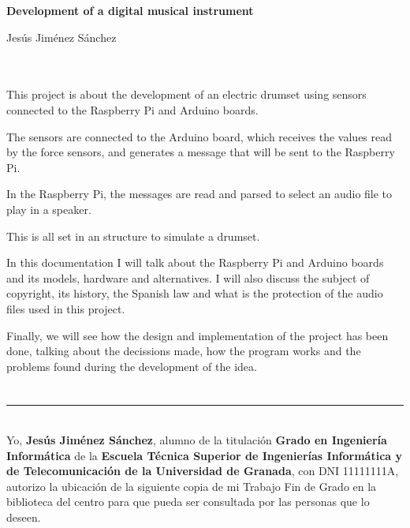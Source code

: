 \cleardoublepage

\thispagestyle{empty}

\begin{center}
       {\large\bfseries Development of a digital musical instrument}\\
\end{center}

\begin{center}
    Jesús Jiménez Sánchez\\
\end{center}

\\

\vspace{0.7cm}
\\

This project is about the development of an electric drumset using sensors connected to the Raspberry Pi and Arduino
boards.

The sensors are connected to the Arduino board, which receives the values read by the force sensors, and generates a
message that will be sent to the Raspberry Pi.

In the Raspberry Pi, the messages are read and parsed to select an audio file to play in a speaker.

This is all set in an structure to simulate a drumset.

In this documentation I will talk about the Raspberry Pi and Arduino boards and its models, hardware and alternatives. I
will also discuss the subject of copyright, its history, the Spanish law and what is the protection of the audio files
used in this project.

Finally, we will see how the design and implementation of the project has been done, talking about the decissions made,
how the program works and the problems found during the development of the idea.

\chapter*{}   %

\thispagestyle{empty}

\noindent\rule[-1ex]{\textwidth}{2pt}\\[4.5ex]

Yo, \textbf{Jesús Jiménez Sánchez}, alumno de la titulación \textbf{Grado en Ingeniería Informática} de la
\textbf{Escuela Técnica Superior de Ingenierías Informática y de Telecomunicación de la Universidad de Granada}, con DNI
11111111A, autorizo la ubicación de la siguiente copia de mi Trabajo Fin de Grado en la biblioteca del centro para que
pueda ser consultada por las personas que lo deseen.

